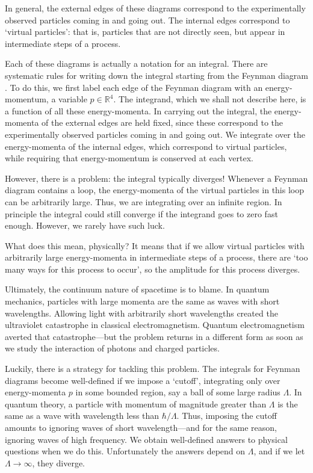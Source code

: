 \documentclass[12pt]{article}
\newcommand{\R}{\mathbb{R}}
\begin{document}
In general, the external edges of these diagrams correspond to the experimentally observed particles coming in and going out.  The internal edges correspond to `virtual particles': that is, particles that are not directly seen, but appear in intermediate steps of a process.

Each of these diagrams is actually a notation for an integral. There are systematic rules for writing down the integral starting from the Feynman diagram \cite{IZ,PS}.  To do this, we first label each edge of the Feynman diagram with an energy-momentum, a variable $p \in \R^4$.   The integrand, which we shall not describe here, is a function of all these energy-momenta.  In carrying out the integral, the energy-momenta of the external edges are held fixed, since these correspond to the experimentally observed particles coming in and going out.  We integrate over the energy-momenta of the internal edges, which correspond to virtual particles, while requiring that energy-momentum is conserved at each vertex.  

However, there is a problem: the integral typically diverges!  Whenever a Feynman diagram contains a loop, the energy-momenta of the virtual particles in this loop can be arbitrarily large.  Thus, we are integrating over an infinite region.  In principle the integral could still converge if the integrand goes to zero fast enough.   However, we rarely have such luck.

What does this mean, physically?  It means that if we allow virtual particles with arbitrarily large energy-momenta in intermediate steps of a process, there are `too many ways for this process to occur', so the amplitude for this process diverges.  

Ultimately, the continuum nature of spacetime is to blame.  In quantum mechanics, particles with large momenta are the same as waves with short wavelengths.   Allowing light with arbitrarily short wavelengths created the ultraviolet catastrophe in classical electromagnetism.  Quantum electromagnetism averted that catastrophe---but the problem returns in a different form as soon as we study the interaction of photons and charged particles.

Luckily, there is a strategy for tackling this problem. The integrals for Feynman diagrams become well-defined if we impose a `cutoff', integrating only over energy-momenta $p$ in some bounded region, say a ball of some large radius $\Lambda$.   In quantum theory, a particle with momentum of magnitude greater than $\Lambda$ is the same as a wave with wavelength less than $\hbar/\Lambda$.    Thus, imposing the cutoff amounts to ignoring waves of short wavelength---and for the same reason, ignoring waves of high frequency.   We obtain well-defined answers to physical questions when we do this.  Unfortunately the answers depend on $\Lambda$, and if we let $\Lambda \to \infty$, they diverge.
\end{document}
